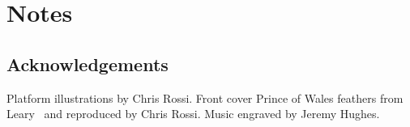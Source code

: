 \part{Notes}

\chapter{Acknowledgements}

Platform illustrations by Chris Rossi. Front cover Prince of Wales feathers from Leary~\cite{leary} and reproduced by Chris Rossi. Music engraved by Jeremy Hughes.



